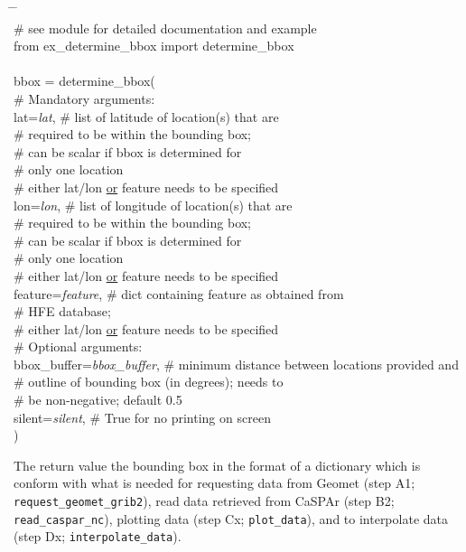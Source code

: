 \documentclass[10pt,a4paper,titlepage,parskip]{scrartcl}
\newenvironment{ttfont}{\fontfamily{\ttdefault}\selectfont}{\par}
\newcommand{\GRAU}[1]{\textcolor{ufzgray2}{#1}}
\begin{document}
\begin{framed}
	\vspace*{-1.2cm}
	\begin{ttfont}
		\begin{tabbing}
			\hspace{1.0cm} \= \hspace{4.7cm} \= \kill \\[4pt]
			\GRAU{\# see module for detailed documentation and example}\\
			from ex\_determine\_bbox import determine\_bbox\\
			\\
			bbox = determine\_bbox(\\
			\> \GRAU{\# Mandatory arguments:}\\
			\> lat=\textit{lat}, \> \GRAU{\# list of latitude of location(s) that are}\\
			\> \> \GRAU{\# required to be within the bounding box;}\\
			\> \> \GRAU{\# can be scalar if bbox is determined for}\\
			\> \> \GRAU{\# only one location}\\
			\> \> \GRAU{\# either lat/lon \underline{or} feature needs to be specified}\\
			\> lon=\textit{lon}, \> \GRAU{\# list of longitude of location(s) that are}\\
			\> \> \GRAU{\# required to be within the bounding box;}\\
			\> \> \GRAU{\# can be scalar if bbox is determined for}\\
			\> \> \GRAU{\# only one location}\\
			\> \> \GRAU{\# either lat/lon \underline{or} feature needs to be specified}\\
			\> feature=\textit{feature}, \> \GRAU{\# dict containing feature as obtained from}\\
			\> \> \GRAU{\# HFE database;}\\
			\> \> \GRAU{\# either lat/lon \underline{or} feature needs to be specified}\\
			\> \GRAU{\# Optional arguments:}\\
			\> bbox\_buffer=\textit{bbox\_buffer}, \> \GRAU{\# minimum distance between locations provided and}\\
			\> \> \GRAU{\# outline of bounding box (in degrees); needs to}\\
			\> \> \GRAU{\# be non-negative; default 0.5}\\
			\> silent=\textit{silent}, \> \GRAU{\# True for no printing on screen}\\
			\> ) \> 
		\end{tabbing}
	\end{ttfont}
	\vspace*{-0.3cm}
\end{framed}
\vspace*{-0.3cm}
The return value the bounding box in the format of a dictionary which is conform with what is needed for requesting data from Geomet (step A1; \texttt{request\_geomet\_grib2}), read data retrieved from CaSPAr (step B2; \texttt{read\_caspar\_nc}), plotting data (step Cx; \texttt{plot\_data}), and to interpolate data (step Dx; \texttt{interpolate\_data}). 
\end{document}
